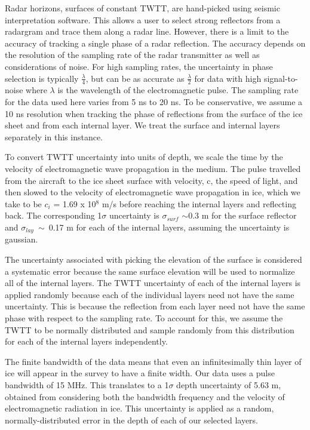 \documentclass[draft,jgrga]{agutex}
\begin{document}
\begin{article}
Radar horizons, surfaces of constant TWTT, are hand-picked using seismic interpretation software. This allows a user to select strong reflectors from a radargram and trace them along a radar line. However, there is a limit to the accuracy of tracking a single phase of a radar reflection. The accuracy depends on the resolution of the sampling rate of the radar transmitter as well as considerations of noise. For high sampling rates, the uncertainty in phase selection is typically $\frac{\lambda}{4}$, but can be as accurate as $\frac{\lambda}{2}$ for data with high signal-to-noise where $\lambda$ is the wavelength of the electromagnetic pulse.  The sampling rate for the data used here varies from 5 ns to 20 ns. To be conservative, we assume a 10 ns resolution when tracking the phase of reflections from the surface of the ice sheet and from each internal layer. We treat the surface and internal layers separately in this instance. 

To convert TWTT uncertainty into units of depth, we scale the time by the velocity of electromagnetic wave propagation in the medium. The pulse travelled from the aircraft to the ice sheet surface with velocity, c, the speed of light, and then slowed to the velocity of electromagnetic wave propagation in ice, which we take to be $\textit{c}_i$ = 1.69 x 10$^8$ m/s before reaching the internal layers and reflecting back. The corresponding 1$\sigma$ uncertainty is $\sigma_{surf}$ $\sim$0.3 m for the surface reflector and $\sigma_{lay}~\sim~$0.17 m for each of the internal layers, assuming the uncertainty is gaussian.
 
The uncertainty associated with picking the elevation of the surface is considered a systematic error because the same surface elevation will be used to normalize all of the internal layers. The TWTT uncertainty of each of the internal layers is applied randomly because each of the individual layers need not have the same uncertainty. This is because the reflection from each layer need not have the same phase with respect to the sampling rate. To account for this, we assume the TWTT to be normally distributed and sample randomly from this distribution for each of the internal layers independently.

The finite bandwidth of the data means that even an infinitesimally thin layer of ice will appear in the survey to have a finite width. Our data uses a pulse bandwidth of 15 MHz. This translates to a 1$\sigma$ depth uncertainty of 5.63 m, obtained from considering both the bandwidth frequency and the velocity of electromagnetic radiation in ice. This uncertainty is applied as a random, normally-distributed error in the depth of each of our selected layers. 





\end{article}
\end{document}
